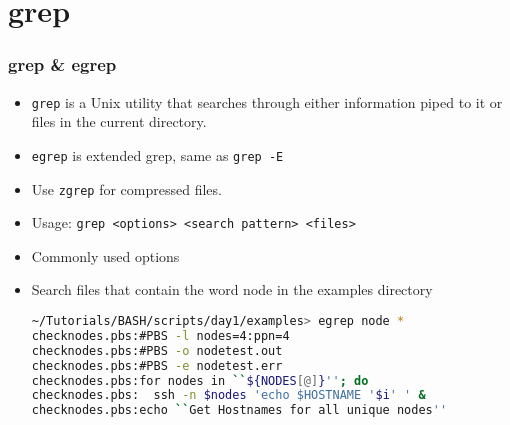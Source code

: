 \documentclass[slidestop,mathserif,compress,xcolor=svgnames]{beamer}
\begin{document}
\section{grep}
\begin{frame}
  \frametitle{\small grep \& egrep}
  \begin{itemize}
    \item \texttt{grep} is a Unix utility that searches through either information piped to it or files in the current directory.
    \item \texttt{egrep} is extended grep, same as \texttt{grep -E}
    \item Use \texttt{zgrep} for compressed files.
    \item Usage: \texttt{grep <options> <search pattern> <files>} 
    \item Commonly used options
  \end{itemize}
  \framebreak
  \begin{itemize}
    \item Search files that contain the word node in the examples directory
      \begin{lstlisting}[language=bash]
~/Tutorials/BASH/scripts/day1/examples> egrep node *
checknodes.pbs:#PBS -l nodes=4:ppn=4
checknodes.pbs:#PBS -o nodetest.out
checknodes.pbs:#PBS -e nodetest.err
checknodes.pbs:for nodes in ``${NODES[@]}''; do
checknodes.pbs:  ssh -n $nodes 'echo $HOSTNAME '$i' ' &
checknodes.pbs:echo ``Get Hostnames for all unique nodes''
      \end{lstlisting}

\end{itemize}
\end{frame}
\end{document}
